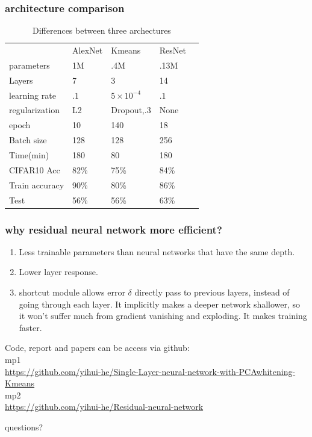 \documentclass{beamer}
\begin{document}
\begin{frame}
\frametitle{architecture comparison}
  \begin{table}[!hbt]
  \centering
  \caption{Differences between three archectures}
  \begin{tabular}{lllll}
  & AlexNet & Kmeans & ResNet & \\
  parameters    & 1M   & .4M & .13M & \\
  Layers      & 7 & 3 & 14 \\
  learning rate & $.1$   & $5\times10^{-4}$ & $.1$ &  \\  
  regularization & L2  & Dropout,.3       & None &  \\
  epoch & 10  & 140       & 18 &  \\    		
  Batch size & 128  & 128       & 256 &  \\    		
  Time(min)  & 180  & 80       & 180 &\\
  CIFAR10 Acc & 82\% & 75\% & 84\% \\
  Train accuracy  & 90\%  & 80\%       & 86\% & \\
  Test  & 56\%  & 56\%       & 63\% &     		
  \end{tabular}
  \end{table}

\end{frame}

\begin{frame}
\frametitle{why residual neural network more efficient?}
\begin{enumerate}
\item Less trainable parameters than neural networks that have the same depth.
\item Lower layer response.
\item shortcut module allows error $\delta$ directly pass to previous layers, 
instead of going through each layer. 
It implicitly makes a deeper network shallower, so it won't suffer much from gradient vanishing and exploding.
It makes training faster.
\end{enumerate}
\end{frame}

\begin{frame}
Code, report and papers can be access via github:\\
mp1\\
\href{https://github.com/yihui-he/Single-Layer-neural-network-with-PCAwhitening-Kmeans}{https://github.com/yihui-he/Single-Layer-neural-network-with-PCAwhitening-Kmeans}\\
mp2\\
\href{https://github.com/yihui-he/Residual-neural-network}{https://github.com/yihui-he/Residual-neural-network}
\end{frame}

\begin{frame}
\Huge{\centerline{questions?}}
\end{frame}
\end{document}
